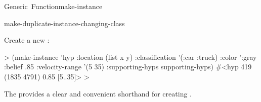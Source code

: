 \documentclass[10pt,twoside,english,pdftex]{article}
\begin{document}
\begin{functiondoc}{Generic~Function}{make-instance}{
     
    }
\begin{alsos}{make-duplicate-instance-changing-class}
\end{alsos}

\fnexample
Create a new  :
%
\W\supp
\begin{example}
  > (make-instance 'hyp 
       :location (list x y)
       :classification '(:car :truck)
       :color ':gray
       :belief .85
       :velocity-range '(5 35)
       :supporting-hyps supporting-hyps)
  #<hyp 419 (1835 4791) 0.85 [5..35]>
  >
\end{example}

\fnnote {}%
The  
provides a clear and convenient shorthand for creating
.

\end{functiondoc}

\end{document}
